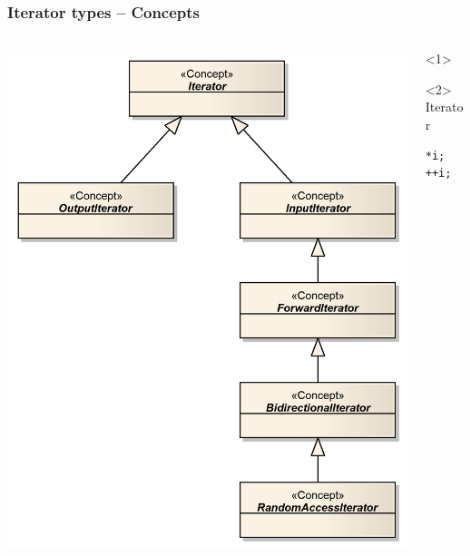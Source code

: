 \documentclass{beamer}
\newcommand{\heading}[1]{\frametitle{#1}}
\begin{document}
\begin{frame}[fragile]
  \heading{Iterator types -- Concepts}
  
  \vspace{2ex}
  
  \begin{columns}[T]
    \begin{column}{0.45\textwidth}
      \centerline{\includegraphics[width=1.0\textwidth]{IteratorsOverview}}
    \end{column}
    \begin{column}{0.55\textwidth}
      \begin{onlyenv}<1>
       
      \end{onlyenv}

      \begin{onlyenv}<2>
       Iterator
       
       \begin{lstlisting}
*i;
++i;
       \end{lstlisting}


\end{onlyenv}
\end{column}
\end{columns}
\end{frame}
\end{document}
